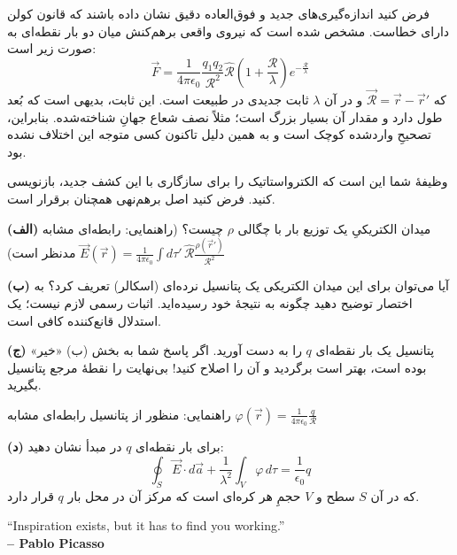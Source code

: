 \documentclass[11pt,a4paper]{article}
\newcommand{\rsep}{\ensuremath{{\scriptstyle\mathcal{R}}}}
\newcommand{\vrsep}{\ensuremath{\vec{\rsep}}}
\newcommand{\hrsep}{\ensuremath{\hat{\rsep}}}
\begin{document}
فرض کنید اندازه‌گیری‌های جدید و فوق‌العاده دقیق نشان داده باشند که قانون کولن دارای خطاست. مشخص شده است که نیروی واقعی برهم‌کنش میان دو بار نقطه‌ای به صورت زیر است:
\[
\vec{F} = \frac{1}{4\pi\epsilon_0} \frac{q_1 q_2}{\rsep^2} \hrsep \left( 1 + \frac{\rsep}{\lambda} \right) e^{-\frac{\rsep}{\lambda}}
\]
که $\vrsep = \vec{r} - \vec{r}'$ و در آن $\lambda$ ثابت جدیدی در طبیعت است. این ثابت، بدیهی است که بُعد طول دارد و مقدار آن بسیار بزرگ است؛ مثلاً نصف شعاع جهانِ شناخته‌شده. بنابراین، تصحیحِ واردشده کوچک است و به همین دلیل تاکنون کسی متوجه این اختلاف نشده بود.

وظیفهٔ شما این است که الکترواستاتیک را برای سازگاری با این کشف جدید، بازنویسی کنید. فرض کنید اصل برهم‌نهی همچنان برقرار است.

\textbf{(الف)} میدان الکتریکیِ یک توزیع بار با چگالی $\rho$ چیست؟ (راهنمایی: رابطه‌ای مشابه $\vec{E}(\vec{r}) = \frac{1}{4\pi\epsilon_0} \int d\tau' \, \hrsep \frac{\rho(\vec{r}')}{\rsep^2}$ مدنظر است)

\textbf{(ب)} آیا می‌توان برای این میدان الکتریکی یک پتانسیل نرده‌ای (اسکالر) تعریف کرد؟ به اختصار توضیح دهید چگونه به نتیجهٔ خود رسیده‌اید. اثبات رسمی لازم نیست؛ یک استدلال قانع‌کننده کافی است.

\textbf{(ج)} پتانسیل یک بار نقطه‌ای $q$ را به دست آورید. اگر پاسخ شما به بخش (ب) «خیر» بوده است، بهتر است برگردید و آن را اصلاح کنید! بی‌نهایت را نقطهٔ مرجع پتانسیل بگیرید.

راهنمایی: منظور از پتانسیل رابطه‌ای مشابه $\varphi(\vec{r}) = \frac{1}{4\pi\epsilon_0} \frac{q}{\rsep}$	

\textbf{(د)} برای بار نقطه‌ای $q$ در مبدأ نشان دهید:
\[
\oint_S \vec{E} \cdot d\vec{a} + \frac{1}{\lambda^2} \int_V \varphi \, d\tau = \frac{1}{\epsilon_0} q
\]
که در آن $S$ سطح و $V$ حجمِ هر کره‌ای است که مرکز آن در محل بار $q$ قرار دارد.

\vfill

\begin{latin}
\noindent
``Inspiration exists, but it has to find you working.'' \\
\textbf{-- Pablo Picasso}
\end{latin}
\end{document}
